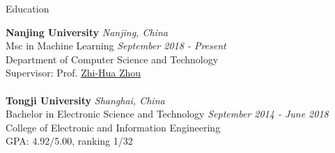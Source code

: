 \documentclass{resume} %
\begin{document}


\begin{rSection}{Education}

{\bf Nanjing University} \hfill {\em Nanjing, China} 
\\ Msc in Machine Learning \hfill {\em  September 2018 - Present}
\\ Department of Computer Science and Technology
\\ Supervisor: Prof. \href{http://cs.nju.edu.cn/zhouzh}{Zhi-Hua Zhou} \\
\\{\bf Tongji University} \hfill{\em Shanghai, China}
\\ Bachelor in Electronic Science and Technology \hfill {\em September 2014  - June 2018} \\ 
College of Electronic and Information Engineering\\
GPA: 4.92/5.00, ranking 1/32
\end{rSection}
\end{document}
